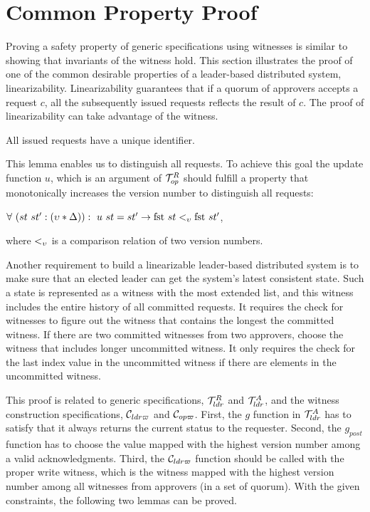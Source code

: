 \section{Common Property Proof}
\label{chapter:witnesspassing:sec:prove-safety-with-witness}

Proving a safety property of generic specifications using witnesses is similar to showing that invariants of the witness hold.
This section illustrates the proof of one of the common desirable properties
of a leader-based distributed system, linearizability.
Linearizability guarantees that if a quorum of approvers accepts a request $c$, 
all the subsequently issued requests reflects the result of $c$. 
The proof of linearizability can take advantage of the witness. 

\begin{lemma}
All issued requests have a unique identifier.
\end{lemma}

This lemma enables us to distinguish all requests. To achieve this goal the 
update function $u$, which is an argument of $\mathcal{T}^{R}_{op}$ should fulfill a 
property that monotonically increases the version number to distinguish all
requests:
\begin{center}
$\forall \ (st \ st' : (\upsilon * \Delta)) : \ u \ st = st' \rightarrow \text{fst }st
<_{\upsilon}  \text{fst }st'$,
\end{center}
where $<_{\upsilon}$ is a comparison relation of two version numbers.


Another requirement to build a linearizable leader-based distributed system is to make sure that an elected leader can get the system's latest consistent
state. Such a state is represented as a witness with the most extended list, and this witness includes the entire history of all committed requests. 
It requires the check for witnesses to figure out the witness that contains the longest the committed witness. If there are two committed witnesses from two approvers, choose the witness that includes longer uncommitted witness. It only requires the check for the last index value in the uncommitted witness if there are elements in the uncommitted witness.


This proof is related to generic specifications, $\mathcal{T}^{R}_{ldr}$ and $\mathcal{T}^{A}_{ldr}$, 
and the witness construction specifications, $\mathcal{C}_{ldr\varpi}$ and $\mathcal{C}_{op\varpi}$.
First, the $g$ function in $\mathcal{T}^{A}_{ldr}$ has to satisfy that  
it always returns the current status to the requester.
Second, the $g_{post}$ function has to choose the value mapped with the highest version number among a valid acknowledgments. 
Third, the $\mathcal{C}_{ldr\varpi}$ function should be called with the proper write witness, which is the witness mapped with the highest version number among all witnesses from  approvers (in a set of quorum).
With the given constraints, the following two lemmas can be proved.

